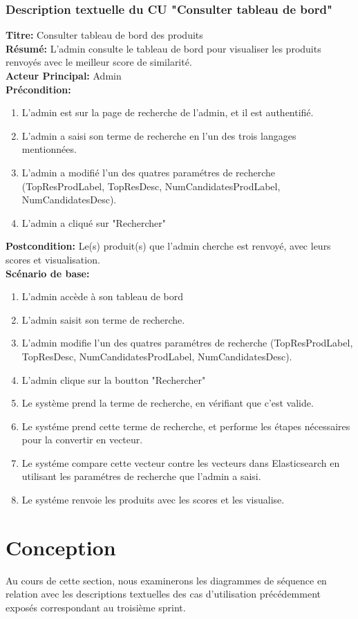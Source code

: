 \subsubsection{Description textuelle du CU "Consulter tableau de bord"}
\noindent
\textbf{Titre:} Consulter tableau de bord des produits \\
\textbf{Résumé:} L'admin consulte le tableau de bord pour visualiser les produits renvoyés avec le meilleur score de similarité. \\
\textbf{Acteur Principal:} Admin \\
\textbf{Précondition:} \begin{enumerate}
	\item L'admin est sur la page de recherche de l'admin, et il est authentifié.
	\item L'admin a saisi son terme de recherche en l'un des trois langages mentionnées.
	\item L'admin a modifié l'un des quatres paramétres de recherche (TopResProdLabel, TopResDesc, NumCandidatesProdLabel, NumCandidatesDesc).
	\item L'admin a cliqué sur "Rechercher"
\end{enumerate}
\textbf{Postcondition:} Le(s) produit(s) que l'admin cherche est renvoyé, avec leurs scores et visualisation. \\
\textbf{Scénario de base: }
\begin{enumerate}
	\item L'admin accède à son tableau de bord
	\item L'admin saisit son terme de recherche.
	\item L'admin modifie l'un des quatres paramétres de recherche (TopResProdLabel, TopResDesc, NumCandidatesProdLabel, NumCandidatesDesc).
	\item L'admin clique sur la boutton "Rechercher"
	\item Le système prend la terme de recherche, en vérifiant que c'est valide.
	\item Le systéme prend cette terme de recherche, et performe les étapes nécessaires pour la convertir en vecteur.
	\item Le systéme compare cette vecteur contre les vecteurs dans Elasticsearch en utilisant les paramétres de recherche que l'admin a saisi.
	\item Le systéme renvoie les produits avec les scores et les visualise.
\end{enumerate}

\newpage
\section{Conception}
\noindent
Au cours de cette section, nous examinerons les diagrammes de séquence en relation avec les descriptions textuelles des cas d'utilisation précédemment exposés correspondant au troisième sprint.

